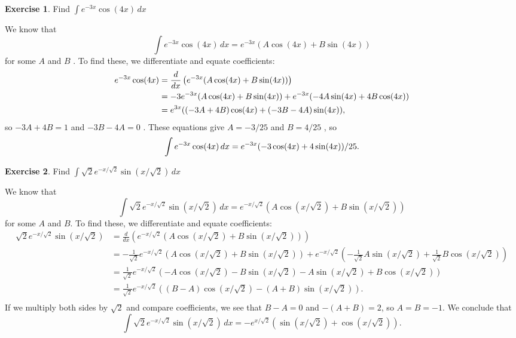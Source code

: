 \documentclass[a4paper]{amsart}
\theoremstyle{definition}
\newtheorem{exercise}{Exercise}[section]
\newenvironment{solution}{{\noindent \bf Solution:}}{}
\begin{document}
\begin{exercise}\label{ex-int-exp-trig-iii}
Find $\int e^{-3x}\cos(4x)\,dx$
\end{exercise}
\begin{solution}
  We know that 
  \[ \int e^{-3x}\cos(4x)\,dx = e^{-3x}(A\cos(4x) + B\sin(4x)) \]
  for some $A$ and $B$ .  To find these, we differentiate and
  equate coefficients: 
  \begin{align*}
   e^{-3x}\cos(4x) &=
    \frac{d}{dx}\left(e^{-3x}(A\cos(4x) + B\sin(4x))\right) \\
    &= -3e^{-3x}(A\cos(4x) + B\sin(4x)) +
        e^{-3x}(-4A\sin(4x) + 4B\cos(4x)) \\
    &= e^{3x}((-3A+4B)\cos(4x) + (-3B-4A)\sin(4x)) ,
  \end{align*}
  so $-3A+4B=1$ and $-3B-4A=0$ \mk.  These equations give $A=-3/25$
  and $B=4/25$ \mk, so 
  \[ \int e^{-3x}\cos(4x)\,dx = e^{-3x}(-3\cos(4x) + 4\sin(4x))/25.  \]
\end{solution}
\begin{exercise}\label{ex-int-exp-trig-iv}
Find $\int \sqrt{2} e^{-x/\sqrt{2}}\sin(x/\sqrt{2})\,dx$
\end{exercise}
\begin{solution}
We know that 
  \[ \int \sqrt{2} e^{-x/\sqrt{2}}\sin(x/\sqrt{2})\,dx =
     e^{-x/\sqrt{2}}(A\cos(x/\sqrt{2}) + B\sin(x/\sqrt{2}))
  \]
  for some $A$ and $B$.  To find these, we differentiate and
  equate coefficients: 
  \begin{align*}
   \sqrt{2} e^{-x/\sqrt{2}}\sin(x/\sqrt{2}) &=
    \frac{d}{dx}\left(
       e^{-x/\sqrt{2}}(A\cos(x/\sqrt{2}) + B\sin(x/\sqrt{2}))
     \right) \\
    &= -\frac{1}{\sqrt{2}}e^{-x/\sqrt{2}}
          (A\cos(x/\sqrt{2}) + B\sin(x/\sqrt{2})) +
        e^{-x/\sqrt{2}}(-\frac{1}{\sqrt{2}}A\sin(x/\sqrt{2}) +
                  \frac{1}{\sqrt{2}}B\cos(x/\sqrt{2})) \\
    &= \frac{1}{\sqrt{2}}e^{-x/\sqrt{2}}\left(
        -A\cos(x/\sqrt{2}) - B\sin(x/\sqrt{2}) -
         A\sin(x/\sqrt{2}) + B\cos(x/\sqrt{2})
       \right) \\
    &= \frac{1}{\sqrt{2}}e^{-x/\sqrt{2}}\left(
        (B-A)\cos(x/\sqrt{2}) - (A+B)\sin(x/\sqrt{2})
       \right). \\
  \end{align*}
  If we multiply both sides by $\sqrt{2}$ and compare
  coefficients, we see that $B-A=0$ and $-(A+B)=2$, so
  $A=B=-1$.  We conclude that 
  \[ \int \sqrt{2} e^{-x/\sqrt{2}}\sin(x/\sqrt{2})\,dx =
      -e^{x/\sqrt{2}} (\sin(x/\sqrt{2}) + \cos(x/\sqrt{2})).
  \]
\end{solution}
\end{document}
